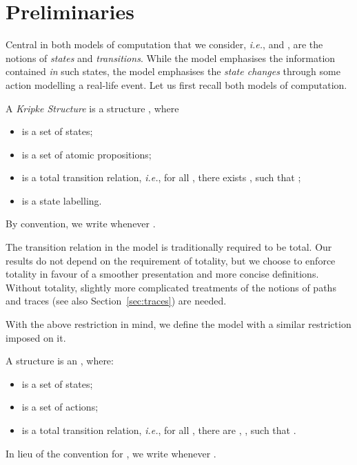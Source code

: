 \documentclass{llncs}
\newcommand{\ie}{\emph{i.e.}}
\begin{document}
\section{Preliminaries}\label{Sect:preliminaries}

Central in both models of computation that we consider, \ie, \KS and
\LTS, are the notions of \emph{states} and \emph{transitions}. While the
\KS model emphasises the information contained \emph{in} such states,
the \LTS model emphasises the \emph{state changes} through some action
modelling a real-life event. Let us first recall both models of computation.

\newcommand{\AP}{\ensuremath{AP\xspace}}
\newcommand{\tuple}[1]{\ensuremath{\langle\,{#1}\,\rangle}}
\begin{definition}
A \emph{Kripke Structure} is a structure , where
\begin{itemize}
\item  is a set of states;

\item  is a set of atomic propositions;

\item  is a total transition relation, \ie, for
all , there exists , such that ;

\item  is a state labelling.
\end{itemize}
\end{definition}
By convention, we write  whenever .

\begin{remark}
The transition relation in the \KS model is traditionally required to be
total. Our results do not depend on the requirement of totality, but
we choose to enforce totality in favour of a smoother presentation and
more concise definitions. Without totality,
slightly more complicated treatments of the notions of paths and traces
(see also Section~\ref{sec:traces}) are needed.
\end{remark}
With the above restriction in mind, we define the \LTS model with
a similar restriction imposed on it.

\newcommand{\act}{\ensuremath{A}ct}
\begin{definition}
A structure  is an \LTS, where:
\begin{itemize}
\item  is a set of states;
\item  is a set of actions;
\item  is a total
transition relation,
\ie, for all , there are , , such that
.
\end{itemize}
\end{definition}
In lieu of the convention for \KS, we write  whenever
.
\end{document}
